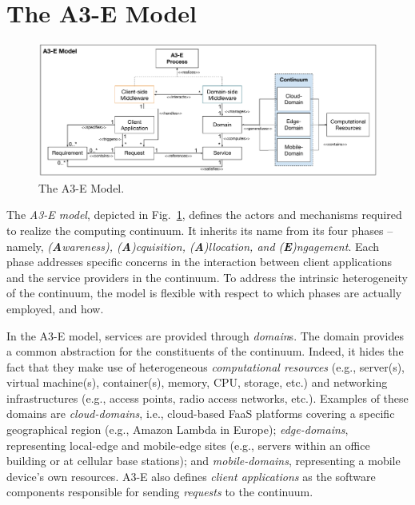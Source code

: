\section{The A3-E Model}\label{sec:proposal}

\begin{figure}[tbp]
	\includegraphics[width=1\textwidth]{figs/A3-E-model.pdf}
	\caption{The A3-E Model.}
	\label{fig:A3-E-model}
\end{figure}

The \textit{A3-E model}, depicted in Fig.~\ref{fig:A3-E-model}, defines the actors and mechanisms required to realize the computing continuum. It inherits its name from its four phases -- namely, \textit{(\textbf{A}wareness), (\textbf{A})cquisition, (\textbf{A})llocation, and (\textbf{E})ngagement}. Each phase addresses specific concerns in the interaction between client applications and the service providers in the continuum. To address the intrinsic heterogeneity of the continuum, the model is flexible with respect to which phases are actually employed, and how.

In the A3-E model, services are provided through \textit{domain}s. The domain provides a common abstraction for the constituents of the continuum. Indeed, it hides the fact that they make use of heterogeneous \textit{computational resources} (e.g., server(s), virtual machine(s), container(s), memory, CPU, storage, etc.) and networking infrastructures (e.g., access points, radio access networks, etc.). Examples of these domains are \textit{cloud-domains}, i.e., cloud-based FaaS platforms covering a specific geographical region (e.g., Amazon Lambda in Europe); \textit{edge-domains}, representing local-edge and mobile-edge sites (e.g., servers within an office building or at cellular base stations); and \textit{mobile-domains}, representing a mobile device's own resources. A3-E also defines \textit{client applications} as the software components responsible for sending \textit{requests} to the continuum.

